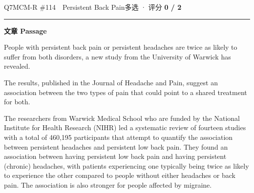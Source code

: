 \documentclass[11pt]{article}
\newcommand{\ptesub}[1]{%
  \par\needspace{2\baselineskip}\smallskip
  {\color{cAccent}\rule[-0.2ex]{3pt}{1.05em}}\hspace{6pt}%
  {\bfseries\color{cHead}#1}\par\nopagebreak\smallskip}
\begin{document}
\begin{qblock}{Q7\quad MCM-R \#114\ \ Persistent Back Pain}{多选 · 评分 \textcolor{cAccent}{\bfseries 0 / 2}}
\ptesub{文章 Passage}
\begin{promptbox}
People with persistent back pain or persistent headaches are twice as likely to suffer from both disorders, a new study from the University of Warwick has revealed.

The results, published in the Journal of Headache and Pain, suggest an association between the two types of pain that could point to a shared treatment for both.

The researchers from Warwick Medical School who are funded by the National Institute for Health Research (NIHR) led a systematic review of fourteen studies with a total of 460,195 participants that attempt to quantify the association between persistent headaches and persistent low back pain. They found an association between having persistent low back pain and having persistent (chronic) headaches, with patients experiencing one typically being twice as likely to experience the other compared to people without either headaches or back pain. The association is also stronger for people affected by migraine.


\end{promptbox}
\end{qblock}
\end{document}
